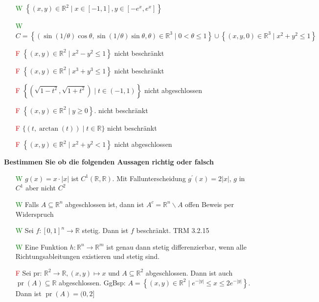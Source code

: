 \begin{flushleft}
\begin{itemize}[leftmargin = *]
\item[\textcolor{green}{W}]  $\left\{(x, y) \in \mathbb{R}^2 \mid x \in[-1,1], y \in\left[-e^x, e^x\right]\right\}$

\item[\textcolor{green}{W}] $C=\left\{(\sin (1 / \theta) \cos \theta, \sin (1 / \theta) \sin \theta, \theta) \in \mathbb{R}^3 \mid 0<\theta \leq 1\right\} \cup\left\{(x, y, 0) \in \mathbb{R}^3 \mid x^2+y^2 \leq 1\right\}$

\item[\textcolor{red}{F}]  $\left\{(x, y) \in \mathbb{R}^2 \mid x^2-y^2 \leq 1\right\}$ \textcolor{Emerald}{nicht beschränkt}
\item[\textcolor{red}{F}]  $\left\{(x, y) \in \mathbb{R}^2 \mid x^3+y^3 \leq 1\right\}$ \textcolor{Emerald}{nicht beschränkt}
\item[\textcolor{red}{F}]  $\left\{\left(\sqrt{1-t^2}, \sqrt{1+t^2}\right) \mid t \in(-1,1)\right\}$ \textcolor{Emerald}{nicht abgeschlossen}
\item[\textcolor{red}{F}]  $\left\{(x, y) \in \mathbb{R}^2 \mid y \geq 0\right\}$. \textcolor{Emerald}{nicht beschränkt}
\item[\textcolor{red}{F}]  $\{(t, \arctan (t)) \mid t \in \mathbb{R}\}$ \textcolor{Emerald}{nicht beschränkt}
\item[\textcolor{red}{F}]  $\left\{(x, y) \in \mathbb{R}^2 \mid x^2+y^2<1\right\}$ \textcolor{Emerald}{nicht abgeschlossen}


\end{itemize}



\textbf{Bestimmen Sie ob die folgenden Aussagen richtig oder falsch}

\begin{itemize}[leftmargin = *]
\item [\textcolor{green}{W}] $g(x)=x \cdot|x|$ ist $C^1(\mathbb{R}, \mathbb{R})$. \textcolor{Emerald}{Mit Fallunterscheidung $g^{\prime}(x)=2 |x|$, $g$ in $C^1$ aber nicht $C^2$}
\item[\textcolor{green}{W}] Falls $A \subseteq \mathbb{R}^n$ abgeschlossen ist, dann ist $A^c=\mathbb{R}^n \backslash A$ offen \textcolor{Emerald}{Beweis per Widerspruch}
\item[\textcolor{green}{W}] Sei $f:[0,1]^n \rightarrow \mathbb{R}$ stetig. Dann ist $f$ beschränkt. \textcolor{Emerald}{TRM 3.2.15}
\item[\textcolor{green}{W}] Eine Funktion $h: \mathbb{R}^n \rightarrow \mathbb{R}^m$ ist genau dann stetig differenzierbar, wenn alle Richtungsableitungen existieren und stetig sind.
\item[\textcolor{red}{F}] Sei pr: $\mathbb{R}^2 \rightarrow \mathbb{R},(x, y) \mapsto x$ und $A \subseteq \mathbb{R}^2$ abgeschlossen. Dann ist auch $\operatorname{pr}(A) \subseteq \mathbb{R}$ abgeschlossen. \textcolor{Emerald}{GgBsp: $A=\left\{(x, y) \in \mathbb{R}^2 \mid e^{-|y|} \leq x \leq 2 e^{-|y|}\right\}$. Dann ist $\operatorname{pr}(A)=(0,2]$}


\end{itemize}
\end{flushleft}

